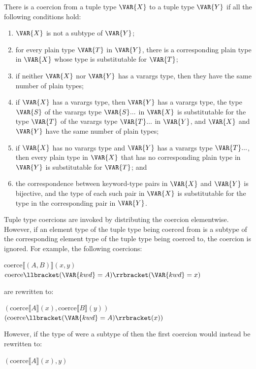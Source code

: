 There is a coercion from a tuple type $\VAR{X}$ to a tuple type
$\VAR{Y}$ if all the following conditions hold:
\begin{enumerate}
\item
$\VAR{X}$ is not a subtype of $\VAR{Y}$;
\item
for every plain type $\VAR{T}$ in $\VAR{Y}$, there is a corresponding
plain type in $\VAR{X}$ whose type is substitutable for $\VAR{T}$;
\item
if neither $\VAR{X}$ nor $\VAR{Y}$ has a varargs type, then they have
the same number of plain types;
\item
if $\VAR{X}$ has a varargs type, then $\VAR{Y}$ has a varargs type,
the type $\VAR{S}$ of the varargs type $\VAR{S}...$ in $\VAR{X}$ is
substitutable for the type $\VAR{T}$ of the varargs type
$\VAR{T}...$ in $\VAR{Y}$, and $\VAR{X}$ and $\VAR{Y}$ have the same
number of plain types;
\item
if $\VAR{X}$ has no varargs type and $\VAR{Y}$ has a varargs type
$\VAR{T}...$, then every plain type in $\VAR{X}$ that has no
corresponding plain type in $\VAR{Y}$ is substitutable for $\VAR{T}$; and
\item
the correspondence between keyword-type pairs in $\VAR{X}$ and
$\VAR{Y}$ is bijective, and the type of each such pair in $\VAR{X}$ is
substitutable for the type in the corresponding pair in $\VAR{Y}$.
\end{enumerate}

Tuple type coercions are invoked by distributing the coercion
elementwise.  However, if an element type of the tuple type being coerced
from is a subtype of the corresponding element type of the tuple type being
coerced to, the coercion is ignored.  For example, the following coercions:
\begin{Fortress}
\(\mathrm{coerce}\llbracket(A, B)\rrbracket(x, y)\)\\
\(\mathrm{coerce}\llbracket(\VAR{kwd}=A)\rrbracket(\VAR{kwd}=x)\)
\end{Fortress}
are rewritten to:
\begin{Fortress}
\((\mathrm{coerce}\llbracket{}A\rrbracket(x), \mathrm{coerce}\llbracket{}B\rrbracket(y))\)\\
\((\mathrm{coerce}\llbracket(\VAR{kwd}=A)\rrbracket(x))\)
\end{Fortress}
However, if the type of  were a subtype of  then the
first coercion would instead be rewritten to:
\begin{Fortress}
\((\mathrm{coerce}\llbracket{}A\rrbracket(x), y)\)
\end{Fortress}

